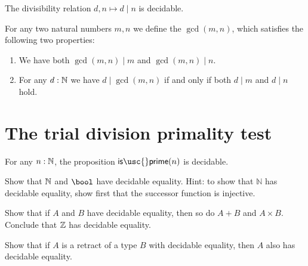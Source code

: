 \begin{lem}
  The divisibility relation $d,n\mapsto d\mid n$ is decidable.
\end{lem}

\begin{defn}
  For any two natural numbers $m,n$ we define the  $\gcd(m,n)$, which satisfies the following two properties:
  \begin{enumerate}
  \item We have both $\gcd(m,n)\mid m$ and $\gcd(m,n)\mid n$.
  \item For any $d:\mathbb{N}$ we have $d\mid \gcd(m,n)$ if and only if both $d\mid m$ and $d\mid n$ hold.
  \end{enumerate}
\end{defn}

\section{The trial division primality test}

\begin{thm}
  For any $n:\mathbb{N}$, the proposition $\mathsf{is\usc{}prime}(n)$ is decidable.
\end{thm}


\begin{exercises}
\item
  \begin{subexenum}
  \item Show that $\mathbb{N}$ and $\bool$ have decidable equality. Hint: to show that $\mathbb{N}$ has decidable equality, show first that the successor function is injective.
  \item Show that if $A$ and $B$ have decidable equality, then so do $A+B$ and $A\times B$. Conclude that $\mathbb{Z}$ has decidable equality.
  \item Show that if $A$ is a retract of a type $B$ with decidable equality, then $A$ also has decidable equality.
  \end{subexenum}
\end{exercises}
